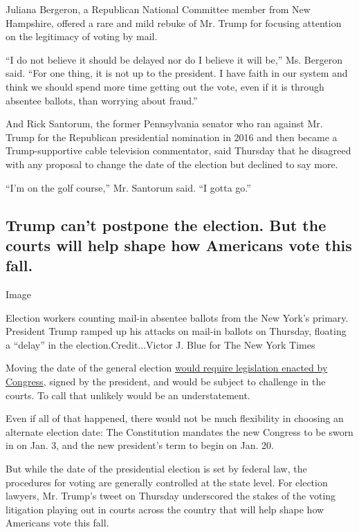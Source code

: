 Juliana Bergeron, a Republican National Committee member from New
Hampshire, offered a rare and mild rebuke of Mr. Trump for focusing
attention on the legitimacy of voting by mail.

``I do not believe it should be delayed nor do I believe it will be,''
Ms. Bergeron said. ``For one thing, it is not up to the president. I
have faith in our system and think we should spend more time getting out
the vote, even if it is through absentee ballots, than worrying about
fraud.''

And Rick Santorum, the former Pennsylvania senator who ran against Mr.
Trump for the Republican presidential nomination in 2016 and then became
a Trump-supportive cable television commentator, said Thursday that he
disagreed with any proposal to change the date of the election but
declined to say more.

``I'm on the golf course,'' Mr. Santorum said. ``I gotta go.''

\hypertarget{trump-cant-postpone-the-election-but-the-courts-will-help-shape-how-americans-vote-this-fall}{%
\subsection{Trump can't postpone the election. But the courts will help
shape how Americans vote this
fall.}\label{trump-cant-postpone-the-election-but-the-courts-will-help-shape-how-americans-vote-this-fall}}

Image

Election workers counting mail-in absentee ballots from the New York's
primary. President Trump ramped up his attacks on mail-in ballots on
Thursday, floating a ``delay'' in the election.Credit...Victor J. Blue
for The New York Times

Moving the date of the general election
\href{https://www.nytimes3xbfgragh.onion/2020/07/30/us/politics/trump-postpone-election.html}{would
require legislation enacted by Congress}, signed by the president, and
would be subject to challenge in the courts. To call that unlikely would
be an understatement.

Even if all of that happened, there would not be much flexibility in
choosing an alternate election date: The Constitution mandates the new
Congress to be sworn in on Jan. 3, and the new president's term to begin
on Jan. 20.

But while the date of the presidential election is set by federal law,
the procedures for voting are generally controlled at the state level.
For election lawyers, Mr. Trump's tweet on Thursday underscored the
stakes of the voting litigation playing out in courts across the country
that will help shape how Americans vote this fall.

